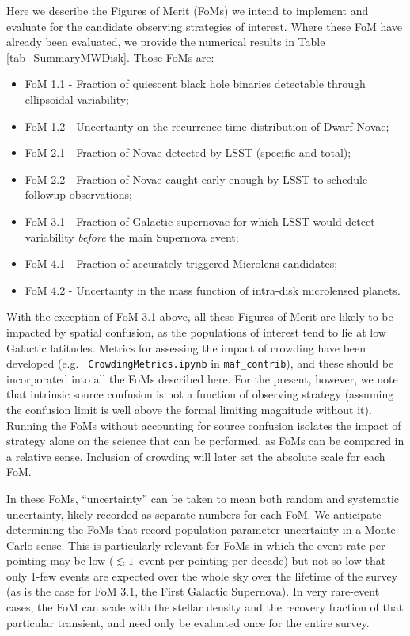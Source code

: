 
Here we describe the Figures of Merit (FoMs) we intend to implement and
evaluate for the candidate observing strategies of interest. Where these
FoM have already been evaluated, we provide the numerical results in
Table \ref{tab_SummaryMWDisk}. Those FoMs are:

\begin{itemize}
  \item FoM 1.1 - Fraction of quiescent black hole binaries detectable through ellipsoidal variability;
  \item FoM 1.2 - Uncertainty on the recurrence time distribution of Dwarf Novae;
  \item FoM 2.1 - Fraction of Novae detected by LSST (specific and total);
  \item FoM 2.2 - Fraction of Novae caught early enough by LSST to schedule followup observations;
  \item FoM 3.1 - Fraction of Galactic supernovae for which LSST would detect variability {\it before} the main Supernova event;
  \item FoM 4.1 - Fraction of accurately-triggered Microlens candidates;
  \item FoM 4.2 - Uncertainty in the mass function of intra-disk microlensed planets.
\end{itemize}

With the exception of FoM 3.1 above, all these Figures of Merit are
likely to be impacted by spatial confusion, as the populations of
interest tend to lie at low Galactic latitudes. Metrics for assessing
the impact of crowding have been developed (e.g. {\tt
  CrowdingMetrics.ipynb} in {\tt maf\_contrib}), and these should be
incorporated into all the FoMs described here. For the present,
however, we note that intrinsic source confusion is not a function of
observing strategy (assuming the confusion limit is well above the
formal limiting magnitude without it). Running the FoMs without
accounting for source confusion isolates the impact of strategy alone
on the science that can be performed, as FoMs can be compared in a
relative sense. Inclusion of crowding will later set the absolute
scale for each FoM.

In these FoMs, ``uncertainty'' can be taken to mean both random and
systematic uncertainty, likely recorded as separate numbers for each
FoM. We anticipate determining the FoMs that record population
parameter-uncertainty in a Monte Carlo sense. This is particularly
relevant for FoMs in which the event rate per pointing may be low
($\lesssim 1$~event per pointing per decade) but not so low that only
1-few events are expected over the whole sky over the lifetime of the
survey (as is the case for FoM 3.1, the First Galactic Supernova). In
very rare-event cases, the FoM can scale with the stellar density and
the recovery fraction of that particular transient, and need only be
evaluated once for the entire survey.

